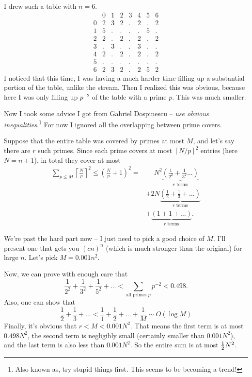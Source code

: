 \documentclass[11pt]{scrartcl}
\begin{document}
I drew such a table with $n=6$.
\[
  \begin{array}{r|ccccccc}
      & 0 & 1 & 2 & 3 & 4 & 5 & 6 \\ \hline
    0 & 2 & 3 & 2 & . & 2 & . & 2 \\
    1 & 5 & . & . & . & . & 5 & . \\
    2 & 2 & . & 2 & . & 2 & . & 2 \\
    3 & . & 3 & . & . & 3 & . & . \\
    4 & 2 & . & 2 & . & 2 & . & 2 \\
    5 & . & . & . & . & . & . & . \\
    6 & 2 & 3 & 2 & . & 2 & 5 & 2
  \end{array}
  \]
I noticed that this time, I was having a much harder time filling up a substantial portion of the table,
unlike the stream.
Then I realized this was obvious, because here I was only filling up $p^{-2}$ of the table with a prime $p$.
This was much smaller.

Now I took some advice I got from Gabriel Dospinescu -- \emph{use obvious
inequalities}.\footnote{Also known as, try stupid things first. This seems to be becoming a trend!}
For now I ignored all the overlapping between prime covers.

Suppose that the entire table was covered by primes at most $M$, and let's say there are $r$ such primes.
Since each prime covers at most $\left\lceil N/p \right\rceil^2$ entries (here $N = n+1$),
in total they cover at most
\begin{align*}
  \sum_{p \le M} \left\lceil \frac Np \right\rceil^2 \le \left( \frac Np +1\right)^2
  =&\phantom+ N^2 \underbrace{\left( \frac{1}{2^2} + \frac{1}{3^2} \dots \right)}_{\text{$r$ terms}} \\
  &+ 2N \underbrace{\left( \frac12 + \frac 13 + \dots   \right)}_{\text{$r$ terms}} \\
  &+ \underbrace{\left( 1+1+\dots \right)}_{\text{$r$ terms}}.
\end{align*}

We're past the hard part now -- I just need to pick a good choice of $M$.
I'll present one that gets you $(cn)^n$ (which is much stronger than the original) for large $n$.
Let's pick $M=0.001n^2$.

Now, we can prove with enough care that
\[ \frac{1}{2^2} + \frac{1}{3^2} + \frac{1}{5^2} + \dots < \sum_{\text{all primes $p$}} p^{-2} <  0.498. \]
Also, one can show that \[ \frac12 + \frac 13 + \dots < \frac11 + \frac12 + \dots + \frac 1M \sim O(\log M) \]
Finally, it's obvious that $r < M < 0.001N^2$.
That means the first term is at most $0.498N^2$,
the second term is negligibly small (certainly smaller than $0.001N^2$),
and the last term is also less than $0.001N^2$.
So the entire sum is at most $\frac{1}{2} N^2$.
\end{document}
